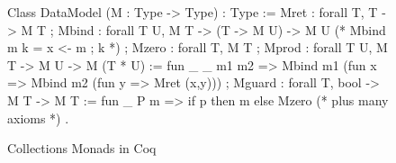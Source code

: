 \documentclass[preprint]{sigplanconf}
\begin{document}
\begin{figure}[t]
\label{fig:chaseable-functor}
\begin{coq}
Class DataModel (M : Type -> Type) : Type :=
{ Mret  : forall {T}, T -> M T
; Mbind : forall {T U}, M T -> (T -> M U) -> M U (* Mbind m k = x <- m ; k *)
; Mzero : forall {T}, M T
; Mprod : forall {T U}, M T -> M U -> M (T * U) :=
     fun _ _ m1 m2 => Mbind m1 (fun x => Mbind m2 (fun y => Mret (x,y)))
; Mguard : forall {T}, bool -> M T -> M T :=
     fun _ P m => if p then m else Mzero
 (* plus many axioms *)
}.
\end{coq}






\caption{Collections Monads in Coq}
\label{fig:chaseable-functor}
\end{figure}
\end{document}

